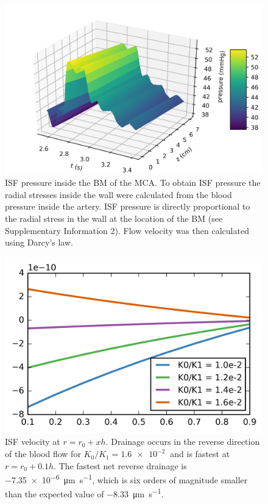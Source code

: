 \documentclass[a4paper,titlepage]{scrartcl}
\begin{document}
\begin{figure}
\centerline{\includegraphics{figures/bm_pressure.png}}
\caption{ISF pressure inside the BM of the MCA. To obtain ISF pressure the radial stresses inside the wall were calculated from the blood pressure inside the artery. ISF pressure is directly proportional to the radial stress in the wall at the location of the BM (see Supplementary Information 2). Flow velocity was then calculated using Darcy's law.\label{fig:bm_pressure}}
\end{figure}

\begin{figure}
\centerline{\includegraphics{figures/valve_test.png}}
\caption{ISF velocity at $r = r_0 + xh$. Drainage occurs in the reverse direction of the blood flow for $K_0/K_1 = \SI{1.6e-2}{}$ and is fastest at $r = r_0 + 0.1h$. The fastest net reverse drainage is \SI{-7.35e-6}{\micro\metre\per\second}, which is six orders of magnitude smaller than the expected value of \SI{-8.33}{\micro\metre\per\second}.\label{fig:valve_test}}
\end{figure}
\end{document}
